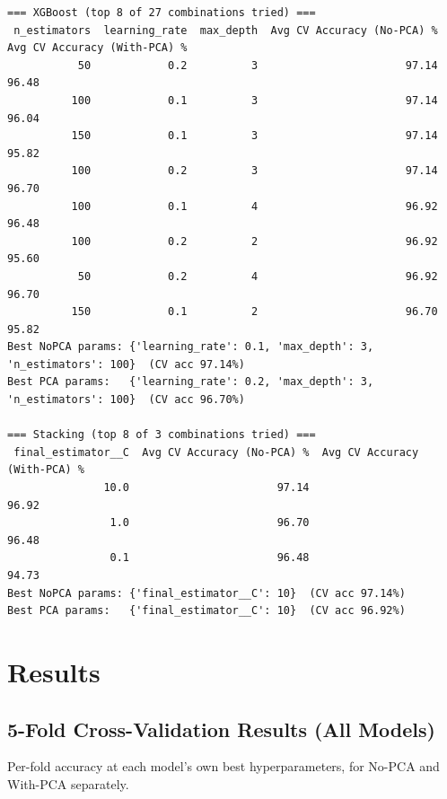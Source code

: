\documentclass[12pt,a4paper]{article}
\begin{document}
\begin{verbatim}
=== XGBoost (top 8 of 27 combinations tried) ===
 n_estimators  learning_rate  max_depth  Avg CV Accuracy (No-PCA) %  Avg CV Accuracy (With-PCA) %
           50            0.2          3                       97.14                         96.48
          100            0.1          3                       97.14                         96.04
          150            0.1          3                       97.14                         95.82
          100            0.2          3                       97.14                         96.70
          100            0.1          4                       96.92                         96.48
          100            0.2          2                       96.92                         95.60
           50            0.2          4                       96.92                         96.70
          150            0.1          2                       96.70                         95.82
Best NoPCA params: {'learning_rate': 0.1, 'max_depth': 3, 'n_estimators': 100}  (CV acc 97.14%)
Best PCA params:   {'learning_rate': 0.2, 'max_depth': 3, 'n_estimators': 100}  (CV acc 96.70%)

=== Stacking (top 8 of 3 combinations tried) ===
 final_estimator__C  Avg CV Accuracy (No-PCA) %  Avg CV Accuracy (With-PCA) %
               10.0                       97.14                         96.92
                1.0                       96.70                         96.48
                0.1                       96.48                         94.73
Best NoPCA params: {'final_estimator__C': 10}  (CV acc 97.14%)
Best PCA params:   {'final_estimator__C': 10}  (CV acc 96.92%)
\end{verbatim}


\section{Results}
\label{sec:orgf864e1a}

\subsection{5-Fold Cross-Validation Results (All Models)}
\label{sec:orgf4a34c7}

Per-fold accuracy at each model's own best hyperparameters, for No-PCA and With-PCA separately.
\end{document}
